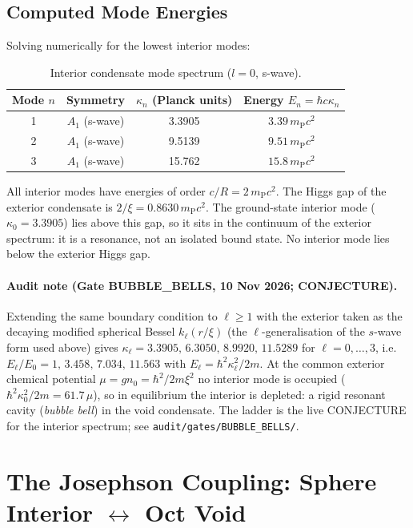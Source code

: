 \documentclass[aps,prl,preprint,superscriptaddress,floatfix]{revtex4-2}
\newcommand{\mP}{m_{\mathrm{P}}}
\newcommand{\Rsph}{R}
\begin{document}
\subsection{Computed Mode Energies}

Solving numerically for the lowest interior modes:
\begin{table}[h]
\centering
\caption{Interior condensate mode spectrum ($l=0$, s-wave).}
\label{tab:spectrum}
\begin{tabular}{cccc}
\toprule
Mode $n$ & Symmetry & $\kappa_n$ (Planck units) & Energy $E_n=\hbar c\kappa_n$ \\
\midrule
1 & $A_1$ (s-wave) & 3.3905 & $3.39\,\mP c^2$ \\
2 & $A_1$ (s-wave) & 9.5139 & $9.51\,\mP c^2$ \\
3 & $A_1$ (s-wave) & 15.762 & $15.8\,\mP c^2$ \\
\bottomrule
\end{tabular}
\end{table}

All interior modes have energies of order $c/\Rsph = 2\,\mP c^2$. The Higgs gap
of the exterior condensate is $2/\xi = 0.8630\,\mP c^2$. The ground-state
interior mode ($\kappa_0=3.3905$) lies above this gap, so it sits in the
continuum of the exterior spectrum: it is a resonance, not an isolated bound
state. No interior mode lies below the exterior Higgs gap.

\paragraph*{Audit note (Gate BUBBLE\_BELLS, 10 Nov 2026; CONJECTURE).} Extending the same boundary condition to $\ell\ge1$ with the exterior taken as the decaying modified spherical Bessel $k_\ell(r/\xi)$ (the $\ell$-generalisation of the $s$-wave form used above) gives $\kappa_\ell=3.3905,\,6.3050,\,8.9920,\,11.5289$ for $\ell=0,\dots,3$, i.e.\ $E_\ell/E_0=1,\,3.458,\,7.034,\,11.563$ with $E_\ell=\hbar^2\kappa_\ell^2/2m$. At the common exterior chemical potential $\mu=gn_0=\hbar^2/2m\xi^2$ no interior mode is occupied ($\hbar^2\kappa_0^2/2m=61.7\,\mu$), so in equilibrium the interior is depleted: a rigid resonant cavity (\emph{bubble bell}) in the void condensate. The ladder is the live CONJECTURE for the interior spectrum; see \texttt{audit/gates/BUBBLE\_BELLS/}.


\section{The Josephson Coupling: Sphere Interior $\leftrightarrow$ Oct Void}
\label{sec:josephson}
\end{document}
